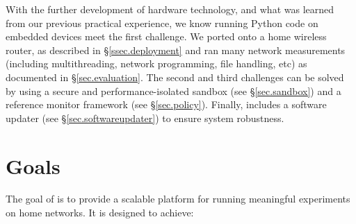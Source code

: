 With the further development of hardware technology, and what was learned from our previous practical experience, we know running Python code on embedded devices meet the first challenge. We ported \sysname onto a home wireless router, as described in \S{\ref{ssec.deployment}} and ran many network measurements (including multithreading, network programming, file handling, etc) as documented in \S{\ref{sec.evaluation}}. The second and third challenges can be solved by using a secure and performance-isolated sandbox (see \S{\ref{sec.sandbox}}) and a reference monitor framework (see \S{\ref{sec.policy}}). Finally, \sysname includes a software updater (see \S{\ref{sec.softwareupdater}}) to ensure system robustness.

\section{Goals}
\label{ssec.goals}
The goal of \sysname is to provide a scalable platform for running meaningful experiments on home networks. It is designed to achieve:
